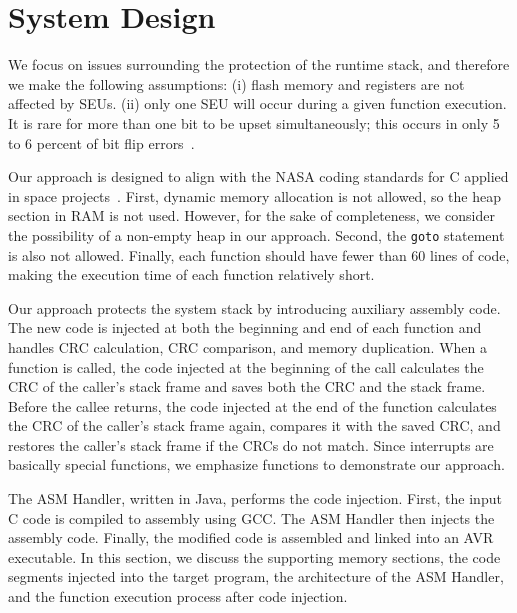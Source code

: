 \vspace{-20pt}
\section{System Design}\label{sec:design}
\vspace{-10pt}
We focus on issues surrounding the protection of the runtime stack, and therefore we make the following assumptions: (i) flash memory and registers are not affected by SEUs. (ii) only one SEU will occur during a given function execution. It is rare for more than one bit to be upset simultaneously; this occurs in only 5 to 6 percent of bit flip errors~\cite{underwood1992sramorbit}. 

Our approach is designed to align with the NASA coding standards for C applied in space projects~\cite{nasa_coding_standard}. First, dynamic memory allocation is not allowed, so the heap section in RAM is not used. However, for the sake of completeness, we consider the possibility of a non-empty heap in our approach. Second, the \texttt{goto} statement is also not allowed. Finally, each function should have fewer than 60 lines of code, making the execution time of each function relatively short.

Our approach protects the system stack by introducing auxiliary assembly code. The new code is injected at both the beginning and end of each function and handles CRC calculation, CRC comparison, and memory duplication. When a function is called, the code injected at the beginning of the call calculates the CRC of the caller's stack frame and saves both the CRC and the stack frame. Before the callee returns, the code injected at the end of the function calculates the CRC of the caller's stack frame again, compares it with the saved CRC, and restores the caller's stack frame if the CRCs do not match. Since interrupts are basically special functions, we emphasize functions to demonstrate our approach.

The ASM Handler, written in Java, performs the code injection. First, the input C code is compiled to assembly using GCC. The ASM Handler then injects the assembly code. Finally, the modified code is assembled and linked into an AVR executable. In this section, we discuss the supporting memory sections, the code segments injected into the target program, the architecture of the ASM Handler, and the function execution process after code injection.
\vspace{-15pt}
